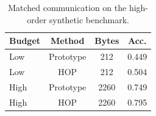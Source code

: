 \begin{table}[t]
\centering
\caption{Matched communication on the high-order synthetic benchmark.}
\label{tab:comm-synth}
\begin{tabular}{lccc}
\toprule
Budget & Method & Bytes & Acc. \\
\midrule
Low & Prototype & 212 & 0.449 \\
Low & HOP & 212 & 0.504 \\
High & Prototype & 2260 & 0.749 \\
High & HOP & 2260 & 0.795 \\
\bottomrule
\end{tabular}
\end{table}
